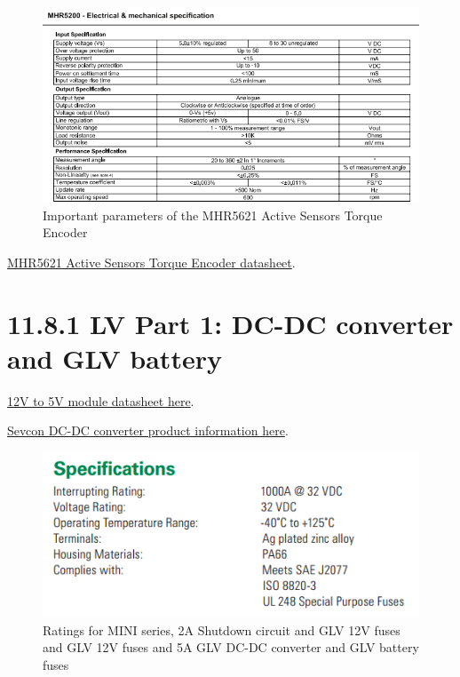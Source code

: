 \documentclass{article}
\begin{document}
{\begin{figure}[H]
    \centering
    \includegraphics[width = 0.6 \textwidth]{activesensorsnip}
    \caption{Important parameters of the MHR5621 Active Sensors Torque Encoder}
    \label{torquesnip}
\end{figure}

\href{http://www.magni-tec.com/datasheet/WS-MHR5200.pdf}{MHR5621 Active Sensors Torque Encoder datasheet}.

\section*{11.8.1 LV Part 1: DC-DC converter and GLV battery}

\href{https://www.superbrightleds.com/moreinfo/bar-strip-accessories/12vdc-to-5vdc-voltage-converter-/1549/3652/#/tab/Specifications}{12V to 5V module datasheet here}.

\href{http://www.evdrives.com/product_p/vr-sevcon-7213.htm}{Sevcon DC-DC converter product information here}.

\begin{figure}[H]
    \centering
    \includegraphics[width = 0.6 \textwidth]{shutdownfuseratings}
    \caption{Ratings for MINI series, 2A Shutdown circuit and GLV 12V fuses and GLV 12V fuses and 5A GLV DC-DC converter and GLV battery fuses}
    \label{shutdownfuseratings}
\end{figure}

}
\end{document}
